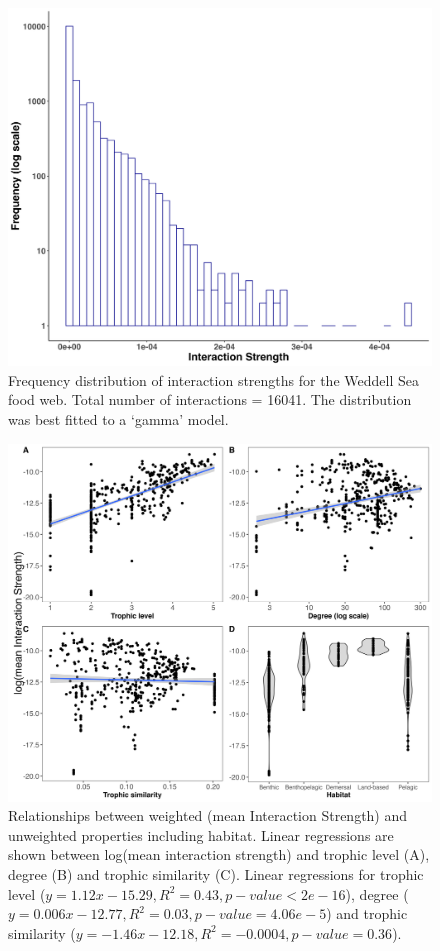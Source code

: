 \documentclass[gc, manuscript]{copernicus}
\begin{document}
\clearpage

\begin{figure}
\includegraphics[width=12cm]{Fig3_IntDist} \caption{Frequency distribution of interaction strengths for the Weddell Sea food web. Total number of interactions = 16041. The distribution was best fitted to a ‘gamma’ model.}\label{fig:unnamed-chunk-3}
\end{figure}

\clearpage

\begin{figure}
\includegraphics[width=12cm]{Fig4_LinReg} \caption{Relationships between weighted (mean Interaction Strength) and unweighted properties including habitat. Linear regressions are shown between log(mean interaction strength) and trophic level (A), degree (B) and trophic similarity (C). Linear regressions for trophic level ($y = 1.12x - 15.29, R^2 = 0.43, p-value < 2e-16$), degree ($y = 0.006x - 12.77, R^2 = 0.03, p-value = 4.06e-5$) and trophic similarity ($y = -1.46x - 12.18, R^2 = -0.0004, p-value = 0.36$).}\label{fig:unnamed-chunk-4}
\end{figure}
\end{document}
